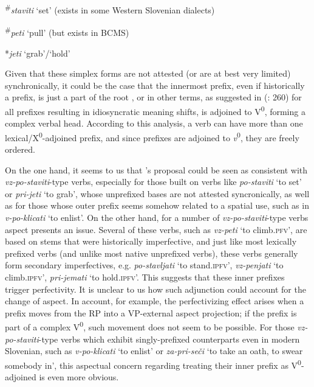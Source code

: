 \documentclass[output=paper,colorlinks,citecolor=brown]{langscibook}
\begin{document}
\ea \label{ex:staviti} \textsuperscript{\#}\textit{staviti} `set' (exists in some Western Slovenian dialects) 
\z

\ea \label{ex:peti} \textsuperscript{\#}\textit{peti} `pull' (but exists in BCMS) 
\z

\ea \label{ex:jeti}*\textit{jeti} `grab'/`hold'
\z

\noindent Given that these simplex forms are not attested (or are at best very limited) synchronically, it could be the case that the innermost prefix, even if historically a prefix, is just a part of the root \citep[cf.][]{fowler1996}, or in other terms, as suggested in \citeauthor{markova2011nature} (\citeyear{markova2011nature}: 260) for all prefixes resulting in idiosyncratic meaning shifts, is adjoined to V\textsuperscript{0}, forming a complex verbal head. According to this analysis, a verb can have more than one lexical/X\textsuperscript{0}-adjoined prefix, and since prefixes are adjoined to \textit{v}\textsuperscript{0}, they are freely ordered.  

 On the one hand, it seems to us that \citeauthor{markova2011nature}'s proposal could be seen as consistent with \textit{vz-po-staviti}-type verbs, especially for those built on verbs like \textit{po-staviti} `to set' or \textit{pri-jeti} `to grab', whose unprefixed bases are not attested syncronically, as well as for those whose outer prefix seems somehow related to a spatial use, such as in \textit{v-po-klicati} `to enlist'. On the other hand, for a number of \textit{vz-po-staviti}-type verbs aspect presents an issue. Several of these verbs, such as \textit{vz-peti} `to climb.\textsc{pfv}', are based on stems that were historically imperfective, and just like most lexically prefixed verbs (and unlike most native unprefixed verbs), these verbs generally form secondary imperfectives, e.g. \textit{po-stavljati} `to stand.\textsc{ipfv}', \textit{vz-penjati} `to climb.\textsc{ipfv}', \textit{pri-jemati} `to hold.\textsc{ipfv}'. This suggests that these inner prefixes trigger perfectivity. It is unclear to us how such adjunction could account for the change of aspect. In  account, for example, the perfectivizing effect arises when a prefix moves from the RP into a VP-external aspect projection; if the prefix is part of a complex V\textsuperscript{0}, such movement does not seem to be possible. For those \textit{vz-po-staviti}-type verbs which exhibit singly-prefixed counterparts even in modern Slovenian, such as \textit{v-po-klicati} `to enlist' or \textit{za-pri-seči} `to take an oath, to swear somebody in', this aspectual concern regarding treating their inner prefix as V\textsuperscript{0}-adjoined is even more obvious. 
 
\end{document}
